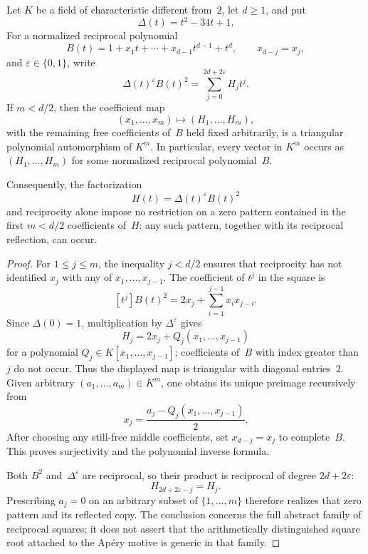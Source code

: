 \begin{proposition}
\label{prop:hasse-square-no-go}
Let $K$ be a field of characteristic different from~$2$, let $d\ge1$, and
put
\[
 \Delta(t)=t^2-34t+1.
\]
For a normalized reciprocal polynomial
\[
 B(t)=1+x_1t+\cdots+x_{d-1}t^{d-1}+t^d,
 \qquad x_{d-j}=x_j,
\]
and $\varepsilon\in\{0,1\}$, write
\[
 \Delta(t)^\varepsilon B(t)^2
 =\sum_{j=0}^{2d+2\varepsilon}H_jt^j.
\]
If $m<d/2$, then the coefficient map
\[
 (x_1,\ldots,x_m)\longmapsto(H_1,\ldots,H_m),
\]
with the remaining free coefficients of~$B$ held fixed arbitrarily, is a
triangular polynomial automorphism of $K^m$.  In particular, every vector
in $K^m$ occurs as $(H_1,\ldots,H_m)$ for some normalized reciprocal
polynomial~$B$.

Consequently, the factorization
\[
 H(t)=\Delta(t)^\varepsilon B(t)^2
\]
and reciprocity alone impose no restriction on a zero pattern contained in
the first $m<d/2$ coefficients of~$H$: any such pattern, together with its
reciprocal reflection, can occur.
\end{proposition}

\begin{proof}
For $1\le j\le m$, the inequality $j<d/2$ ensures that reciprocity has not
identified $x_j$ with any of $x_1,\ldots,x_{j-1}$.  The coefficient of
$t^j$ in the square is
\[
 [t^j]B(t)^2
 =2x_j+\sum_{i=1}^{j-1}x_ix_{j-i}.
\]
Since $\Delta(0)=1$, multiplication by $\Delta^\varepsilon$ gives
\[
 H_j=2x_j+Q_j(x_1,\ldots,x_{j-1})
\]
for a polynomial $Q_j\in K[x_1,\ldots,x_{j-1}]$; coefficients of~$B$
with index greater than~$j$ do not occur.  Thus the displayed map is
triangular with diagonal entries~$2$.  Given arbitrary
$(a_1,\ldots,a_m)\in K^m$, one obtains its unique preimage recursively from
\[
 x_j=\frac{a_j-Q_j(x_1,\ldots,x_{j-1})}{2}.
\]
After choosing any still-free middle coefficients, set $x_{d-j}=x_j$ to
complete~$B$.  This proves surjectivity and the polynomial inverse formula.

Both $B^2$ and~$\Delta^\varepsilon$ are reciprocal, so their product is
reciprocal of degree $2d+2\varepsilon$:
\[
 H_{2d+2\varepsilon-j}=H_j.
\]
Prescribing $a_j=0$ on an arbitrary subset of $\{1,\ldots,m\}$ therefore
realizes that zero pattern and its reflected copy.  The conclusion concerns
the full abstract family of reciprocal squares; it does not assert that the
arithmetically distinguished square root attached to the Ap\'ery motive is
generic in that family.
\end{proof}
